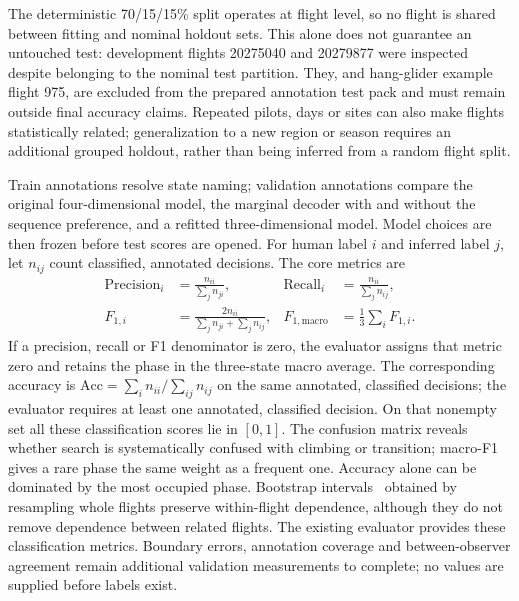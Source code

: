 The deterministic 70/15/15\% split operates at flight level, so no flight is shared
between fitting and nominal holdout sets. This alone does not guarantee an untouched
test: development flights 20275040 and 20279877 were inspected despite belonging to
the nominal test partition. They, and hang-glider example flight 975, are excluded from the prepared annotation
test pack and must remain outside final accuracy claims. Repeated pilots, days or sites can also
make flights statistically related; generalization to a new region or season requires
an additional grouped holdout, rather than being inferred from a random flight split.

Train annotations resolve state naming; validation annotations compare the original
four-dimensional model, the marginal decoder with and without the sequence preference,
and a refitted three-dimensional model. Model choices are then frozen before test
scores are opened. For human label $i$ and inferred label $j$, let $n_{ij}$ count
classified, annotated decisions. The core metrics are
\begin{equation}
 \begin{aligned}
 \mathrm{Precision}_i&=\frac{n_{ii}}{\sum_jn_{ji}},&
 \mathrm{Recall}_i&=\frac{n_{ii}}{\sum_jn_{ij}},\\
 F_{1,i}&=\frac{2n_{ii}}{\sum_jn_{ji}+\sum_jn_{ij}},&
 F_{1,\mathrm{macro}}&=\frac13\sum_iF_{1,i}.
 \end{aligned}
 \label{eq:phasevalidationmetrics}
\end{equation}
If a precision, recall or F1 denominator is zero, the evaluator assigns that metric
zero and retains the phase in the three-state macro average.
The corresponding accuracy is
$\mathrm{Acc}=\sum_i n_{ii}/\sum_{ij}n_{ij}$ on the same annotated, classified decisions;
the evaluator requires at least one annotated, classified decision. On that
nonempty set all these classification scores lie in $[0,1]$. The confusion matrix reveals whether search is systematically confused with climbing or
transition; macro-F1 gives a rare phase the same weight as a frequent one. Accuracy alone
can be dominated by the most occupied phase. Bootstrap intervals~\cite{efron1979}
obtained by resampling whole flights preserve
within-flight dependence, although they do not remove dependence between related flights.
The existing evaluator provides these classification metrics. Boundary errors, annotation
coverage and between-observer agreement remain additional validation measurements to
complete; no values are supplied before labels exist.

